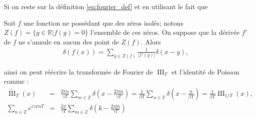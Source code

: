 Si on reste sur la définition \eqref{eq:fourier_def} et en utilisant le fait que

\begin{Theo}
    Soit $f$ une fonction ne possédant que des zéros isolés; notons $Z(f)  = \{ y \in \mathbb R \vert  f(y)= 0 \} $ l'ensemble de ces zéros. On suppose que la dérivée $f'$ de $f$ ne s'annule en aucun des point de $Z(f)$. Alors 
    \begin{eqnarray}
        \delta ( f(x)) = \sum_{y \in Z(f)} \frac{1}{\vert f'(y) \vert } \delta ( x - y ),
    \end{eqnarray}
\end{Theo}

ainsi on peut réécrire la transformée de Fourier de $\operatorname{III}_T$ et l'identité de Poisson comme :
\begin{eqnarray}
    \widetilde{\operatorname{III}}_T(x) & = & \frac{2\pi \alpha}{\gamma T} \sum_{m\in\mathbb Z} \delta\!\left(x - \frac{2\pi m}{\gamma T}\right) =  \frac{1}{\beta T}\sum_{n\in\mathbb Z}\delta\!\left(x-\frac{n}{\beta T}\right) = \frac{1}{ \beta T }\operatorname{III}_{1/T}(x), \\ 
    \sum_{n\in\mathbb Z} e^{i\gamma x nT}  & = &  \frac{2\pi}{\gamma T} \sum_{m\in\mathbb Z} \delta\!\left(k - \frac{2\pi m}{\gamma T}\right)
\end{eqnarray}

